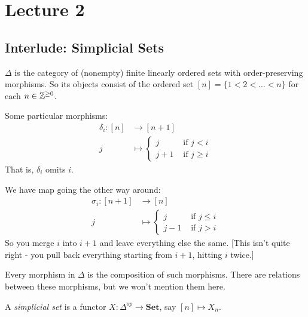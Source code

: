 \documentclass[class=report, crop=false,a4paper,twoside]{standalone}
\begin{document}
\chapter{Lecture 2}
\section{Interlude: Simplicial Sets}
\begin{definition}
	$\Delta$ is the category of (nonempty) finite linearly ordered sets with order-preserving morphisms. So its objects consist of the ordered set $[n] = \{1 < 2 < \dots < n\}$ for each $n \in \mathbb{Z}^{\ge 0}$.
\end{definition}

\begin{example}
	Some particular morphisms:
	\begin{align*}
		\delta_i: [n] &\to [n+1]\\
		j &\mapsto
		\begin{cases}
			j & \text{ if } j < i\\
			j+1 & \text{ if } j \ge i
		\end{cases}
	\end{align*}
	That is, $\delta_i$ omits $i$.

	We have map going the other way around:
	\begin{align*}
		\sigma_i: [n+1] &\to [n]\\
		j &\mapsto
		\begin{cases}
			j &\text{ if } j \le i\\
			j-1 &\text{ if } j > i
		\end{cases}
	\end{align*}
	So you merge $i$ into $i+1$ and leave everything else the same. [This isn't quite right - you pull back everything starting from $i+1$, hitting $i$ twice.]
\end{example}

\begin{remark}\label{simplicial_composition}
Every morphism in $\Delta$ is the composition of such morphisms.
There are relations between these morphisms, but we won't mention them here. 
\end{remark}

\begin{definition}
	A \emph{simplicial set} is a functor $X: \Delta^{op} \to \mathbf{Set}$, say $[n] \mapsto X_n$. 
\end{definition}
\end{document}
